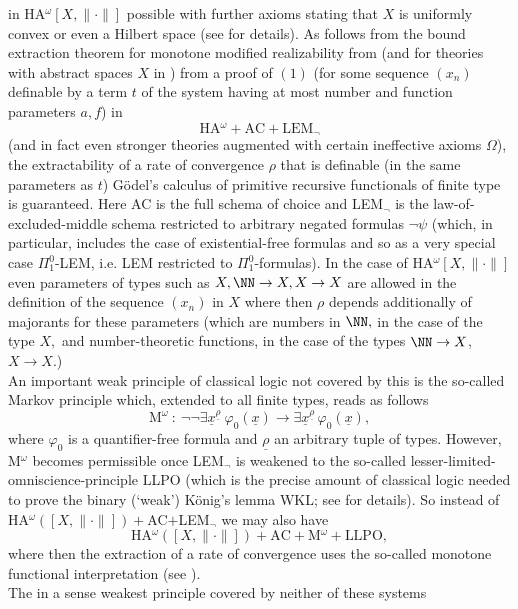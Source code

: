 in HA$^{\omega}[X,\|\cdot\|]$ possible with further axioms stating that 
$X$ is uniformly convex or even a Hilbert space (see \cite{Kohlenbach08} 
for details). 
As follows from the bound extraction theorem for monotone modified 
realizability from \cite{Kohlenbach08} (and for theories with 
abstract spaces $X$ in \cite{GerKoh06}) from a proof of $(1)$ (for 
some sequence $(x_n)$ definable by a term $t$ of the system having at most 
number and function parameters $a,f$) in 
\[ \mbox{HA$^{\omega} +$AC$+$LEM}_{\neg} \] 
(and in fact even stronger theories augmented with certain ineffective 
axioms $\Omega$), the extractability of a rate of convergence $\rho$ that 
is definable (in the same parameters as $t$) 
G\"odel's calculus of primitive recursive functionals of 
finite type is guaranteed.  Here AC is the full schema of choice and 
LEM$_{\neg}$ is the law-of-excluded-middle schema restricted to arbitrary 
negated formulas $\neg\psi$ (which, in particular, includes the case 
of existential-free formulas and so as a very special case $\Pi^0_1$-LEM, 
i.e. LEM restricted to $\Pi^0_1$-formulas). In the case of 
HA$^{\omega}[X,\| \cdot\|]$ even parameters of types such as $X, \NN\to X, 
X\to X$ are allowed in the definition of the sequence $(x_n)$ in $X$ where 
then $\rho$ depends additionally of majorants for these parameters (which are 
numbers in $\NN,$ in the case of the type $X,$ and number-theoretic 
functions, in the case of the types $\NN\to X$, $X\to X.$) \\[2mm] 
An important weak principle of classical logic not covered by this is 
the so-called Markov principle which, extended to all finite types, reads 
as follows 
\[ \mbox{M}^{\omega}\ :\ 
\neg\neg\exists \underline{x}^{\underline{\rho}} \ \varphi_0(\underline{x})\to 
\exists \underline{x}^{\underline{\rho}}\,\varphi_0(\underline{x}), \] 
where $\varphi_0$ is a quantifier-free formula and $\underline{\rho}$ an 
arbitrary tuple of types. However, M$^{\omega}$ becomes permissible once 
LEM$_{\neg}$ is weakened to the so-called lesser-limited-omniscience-principle 
LLPO (which is the precise amount of classical logic needed to prove the 
binary (`weak') K\"onig's lemma WKL; see \cite{Kohlenbach08} for details).
So instead of HA$^{\omega}([X,\|\cdot\|])+$AC$+$LEM$_{\neg}$ we may also have 
\[ \mbox{HA$^{\omega}([X,\|\cdot \| ])+$AC$+$M$^{\omega}+$LLPO}, \] 
where then the extraction of a rate of convergence uses the so-called 
monotone functional interpretation (see \cite{Kohlenbach08}).
\\[2mm] The in a sense weakest principle covered by neither of these systems 
